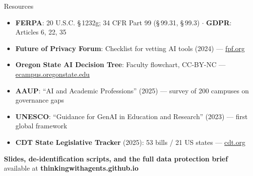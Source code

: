 \documentclass[aspectratio=169, 10pt]{beamer}
\begin{document}
\begin{frame}{Resources}

\small

\begin{tcolorbox}[keybox, title={\faBook\quad Key Resources}]
\begin{itemize}\scriptsize
  \item \textbf{FERPA}: 20 U.S.C. \S\,1232g; 34 CFR Part 99 (\S\,99.31, \S\,99.3) $\cdot$ \textbf{GDPR}: Articles 6, 22, 35
  \item \textbf{Future of Privacy Forum}: Checklist for vetting AI tools (2024) --- \href{https://fpf.org/blog/fpf-develops-checklist-guide-to-help-schools-vet-ai-tools-for-legal-compliance/}{fpf.org}
  \item \textbf{Oregon State AI Decision Tree}: Faculty flowchart, CC-BY-NC --- \href{https://ecampus.oregonstate.edu/faculty/artificial-intelligence-tools/decision-tree/}{ecampus.oregonstate.edu}
  \item \textbf{AAUP}: ``AI and Academic Professions'' (2025) --- survey of 200 campuses on governance gaps
  \item \textbf{UNESCO}: ``Guidance for GenAI in Education and Research'' (2023) --- first global framework
  \item \textbf{CDT State Legislative Tracker} (2025): 53 bills / 21 US states --- \href{https://cdt.org/insights/states-focused-on-responsible-use-of-ai-in-education-during-the-2025-legislative-session/}{cdt.org}
\end{itemize}
\end{tcolorbox}

\vspace{0.15cm}

\begin{tcolorbox}[accentbox]
\centering
\footnotesize
\textbf{Slides, de-identification scripts, and the full data protection brief}\\
available at \textbf{thinkingwithagents.github.io}
\end{tcolorbox}

\end{frame}
\end{document}
